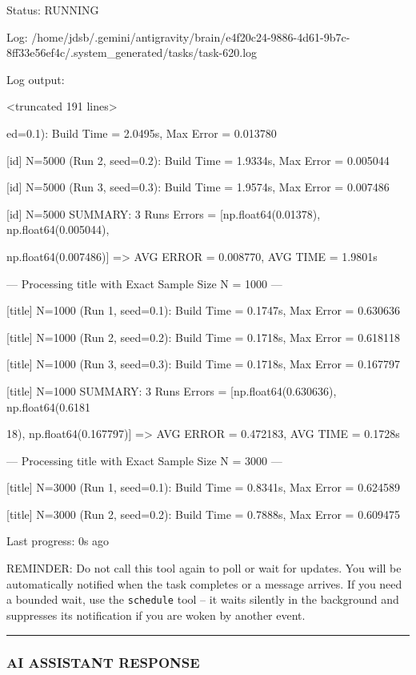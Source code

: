\documentclass[11pt,a4paper]{article}
\begin{document}
Status: RUNNING

Log: /home/jdsb/.gemini/antigravity/brain/e4f20c24-9886-4d61-9b7c-8ff33e56ef4c/.system\_generated/tasks/task-620.log

Log output:

<truncated 191 lines>

ed=0.1): Build Time = 2.0495s, Max Error = 0.013780

[id] N=5000 (Run 2, seed=0.2): Build Time = 1.9334s, Max Error = 0.005044

[id] N=5000 (Run 3, seed=0.3): Build Time = 1.9574s, Max Error = 0.007486

[id] N=5000 SUMMARY: 3 Runs Errors = [np.float64(0.01378), np.float64(0.005044),

np.float64(0.007486)] => AVG ERROR = 0.008770, AVG TIME = 1.9801s


--- Processing title with Exact Sample Size N = 1000 ---

[title] N=1000 (Run 1, seed=0.1): Build Time = 0.1747s, Max Error = 0.630636

[title] N=1000 (Run 2, seed=0.2): Build Time = 0.1718s, Max Error = 0.618118

[title] N=1000 (Run 3, seed=0.3): Build Time = 0.1718s, Max Error = 0.167797

[title] N=1000 SUMMARY: 3 Runs Errors = [np.float64(0.630636), np.float64(0.6181

18), np.float64(0.167797)] => AVG ERROR = 0.472183, AVG TIME = 0.1728s

--- Processing title with Exact Sample Size N = 3000 ---

[title] N=3000 (Run 1, seed=0.1): Build Time = 0.8341s, Max Error = 0.624589

[title] N=3000 (Run 2, seed=0.2): Build Time = 0.7888s, Max Error = 0.609475


Last progress: 0s ago



REMINDER: Do not call this tool again to poll or wait for updates. You will be automatically notified when the task completes or a message arrives. If you need a bounded wait, use the \texttt{schedule} tool -- it waits silently in the background and suppresses its notification if you are woken by another event.


\hrule

\subsubsection{AI ASSISTANT RESPONSE}
\end{document}
